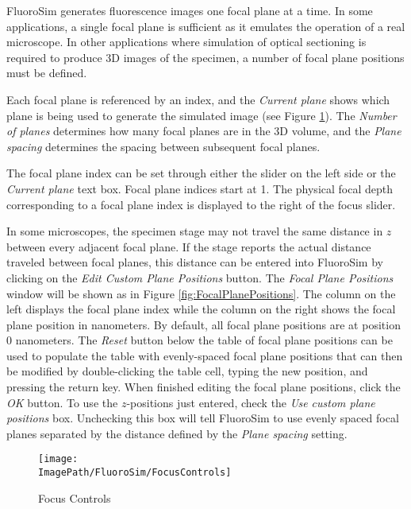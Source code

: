 \documentclass[11pt,titlepage,twoside]{article}
\begin{document}
FluoroSim generates fluorescence images one focal plane at a time. In some applications, a single focal plane is sufficient as it emulates the operation of a real microscope. In other applications where simulation of optical sectioning is required to produce 3D images of the specimen, a number of focal plane positions must be defined. 

Each focal plane is referenced by an index, and the \emph{Current plane} shows which plane is being used to generate the simulated image (see Figure \ref{fig:FluoroSimFocusControls}). The \emph{Number of planes} determines how many focal planes are in the 3D volume, and the \emph{Plane spacing} determines the spacing between subsequent focal planes.

The focal plane index can be set through either the slider on the left side or the \emph{Current plane} text box. Focal plane indices start at 1. The physical focal depth corresponding to a focal plane index is displayed to the right of the focus slider.

In some microscopes, the specimen stage may not travel the same distance in $z$ between every adjacent focal plane. If the stage reports the actual distance traveled between focal planes, this distance can be entered into FluoroSim by clicking on the \emph{Edit Custom Plane Positions} button. The \emph{Focal Plane Positions} window will be shown as in Figure \ref{fig:FocalPlanePositions}. The column on the left displays the focal plane index while the column on the right shows the focal plane position in nanometers. By default, all focal plane positions are at position 0 nanometers. The \emph{Reset} button below the table of focal plane positions can be used to populate the table with evenly-spaced focal plane positions that can then be modified by double-clicking the table cell, typing the new position, and pressing the return key. When finished editing the focal plane positions, click the \emph{OK} button. To use the $z$-positions just entered, check the \emph{Use custom plane positions} box. Unchecking this box will tell FluoroSim to use evenly spaced focal planes separated by the distance defined by the \emph{Plane spacing} setting.

\begin{figure}[tbp] %
   \centering
   \texttt{[image: \\ImagePath/FluoroSim/FocusControls]} 
   \caption{Focus Controls}
   \label{fig:FluoroSimFocusControls}
\end{figure}
\end{document}
